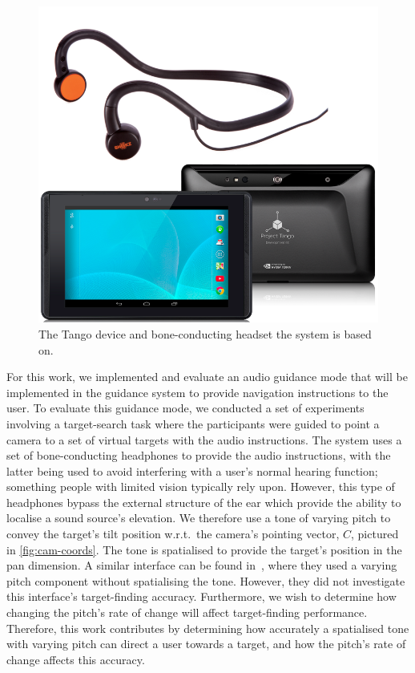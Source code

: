 \documentclass[sigconf, screen=true, anonymous=true]{acmart}
\begin{document}
\begin{figure}
  \centering
  \includegraphics[width=0.5\columnwidth]{figures/tango_headphone.png}
  \caption{The Tango device and bone-conducting headset the system is based on. }\label{fig:tango-headphone}
\end{figure}

For this work, we implemented and evaluate an audio guidance mode that will be implemented in the guidance system to provide navigation instructions to the user. 
To evaluate this guidance mode, we conducted a set of experiments involving a target-search task where the participants were guided to point a camera to a set of virtual targets with the audio instructions.
The system uses a set of bone-conducting headphones to provide the audio instructions, with the latter being used to avoid interfering with a user's normal hearing function; something people with limited vision typically rely upon. 
However, this type of headphones bypass the external structure of the ear which provide the ability to localise a sound source's elevation.
We therefore use a tone of varying pitch to convey the target's tilt position w.r.t.\ the camera's pointing vector, $C$, pictured in \cref{fig:cam-coords}.
The tone is spatialised to provide the target's position in the pan dimension.
A similar interface can be found in~\cite{durette2008visuo}, where they used a varying pitch component without spatialising the tone. 
However, they did not investigate this interface's target-finding accuracy.
Furthermore, we wish to determine how changing the pitch's rate of change will affect target-finding performance. 
Therefore, this work contributes by determining how accurately a spatialised tone with varying pitch can direct a user towards a target, and how the pitch's rate of change affects this accuracy.
\end{document}
